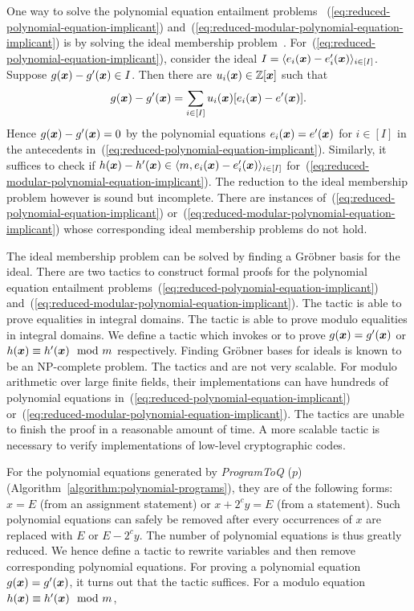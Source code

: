 One way to solve the polynomial equation entailment problems
~(\ref{eq:reduced-polynomial-equation-implicant})
and~(\ref{eq:reduced-modular-polynomial-equation-implicant}) is by
solving the ideal membership problem~\cite{H:07:AENTP,BS:16:GFEV}. 
For~(\ref{eq:reduced-polynomial-equation-implicant}), consider the
ideal $I = \langle e_i(\vx) - e'_i(\vx) \rangle_{i \in [I]}$. Suppose
$g(\vx) - g'(\vx) \in I$. Then there are $u_i(\vx) \in \bbfZ[\vx]$
such that 
\[
g(\vx) - g'(\vx) = \sum\limits_{i \in [I]} u_i (\vx) [e_i (\vx) - e' (\vx)].
\]
Hence $g(\vx) - g'(\vx) = 0$ by the polynomial equations $e_i (\vx) =
e' (\vx)$ for $i \in [I]$ in the antecedents
in~(\ref{eq:reduced-polynomial-equation-implicant}). Similarly, it
suffices to check if $h(\vx) - h'(\vx) \in \langle m, e_i(\vx) -
e'_i(\vx) \rangle_{i \in [I]}$
for~(\ref{eq:reduced-modular-polynomial-equation-implicant}).
The reduction to the ideal membership problem however is sound but
incomplete. There are instances
of~(\ref{eq:reduced-polynomial-equation-implicant})
or~(\ref{eq:reduced-modular-polynomial-equation-implicant}) whose
corresponding ideal membership problems do not hold. 

The ideal membership problem can be solved by finding a Gr\"obner
basis for the ideal. There are two \coq tactics to
construct formal proofs for the polynomial equation entailment
problems~(\ref{eq:reduced-polynomial-equation-implicant})
and~(\ref{eq:reduced-modular-polynomial-equation-implicant}). 
The tactic  is able to prove
equalities in integral domains. The tactic  is able
to prove modulo equalities in integral domains. We define a
\coq tactic which invokes  or  
to prove $g (\vx) = g' (\vx)$ or $h (\vx) \equiv
h' (\vx) \mod m$ respectively. Finding Gr\"obner bases for ideals is
known to be an NP-complete problem.  
The tactics  and  are not very
scalable.
For modulo arithmetic over large finite fields, their 
implementations can have hundreds of polynomial equations
in~(\ref{eq:reduced-polynomial-equation-implicant})
or~(\ref{eq:reduced-modular-polynomial-equation-implicant}). 
The \coq tactics are unable to finish
the proof in a reasonable amount of time. A more scalable tactic is
necessary to verify implementations of low-level cryptographic codes.

For the polynomial equations generated by \textit{ProgramToQ}
($p$) (Algorithm~\ref{algorithm:polynomial-programs}), they are of the
following forms: $x = E$ (from an assignment statement) or $x + 2^c y
= E$ (from a  statement). Such polynomial equations can
safely be removed after every occurrences of $x$ are replaced with $E$
or $E - 2^c y$. The number of polynomial equations is thus greatly
reduced. We hence define a \coq tactic to rewrite variables and then
remove corresponding polynomial equations. For proving a polynomial
equation $g (\vx) = g' (\vx)$, it turns out that the \coq tactic
 suffices. For a modulo equation $h (\vx) \equiv
h' (\vx) \mod m$, 
